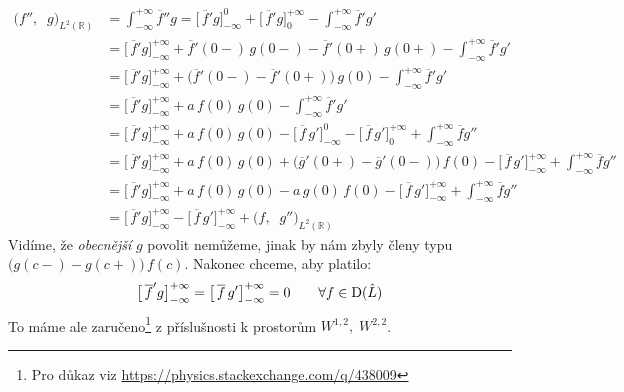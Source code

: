 \documentclass{article}
\newcommand{\R}{\mathbb{R}}
\begin{document}
\begin{align*}
    \big( f'', \;\; g \big)_{L^2(\R)}
    &= \int_{-\infty}^{+\infty} \overline f'' g
    = \big[ \, \overline f' g \big]_{-\infty}^{0}
    + \big[ \, \overline f' g \big]_{0}^{+\infty}
    - \int_{-\infty}^{+\infty} \overline f' g' \\[5pt]
    &= \big[ \, \overline f' g \big]_{-\infty}^{+\infty}
    + \overline f'\!(0-) \, g(0-) - \overline f'\!(0+) \, g(0+)
    - \int_{-\infty}^{+\infty} \overline f' g' \\[5pt]
    &= \big[ \, \overline f' g \big]_{-\infty}^{+\infty}
    + \Big( \overline f'(0-) - \overline f'(0+) \Big) \, g(0)
    - \int_{-\infty}^{+\infty} \overline f' g' \\[5pt]
    &= \big[ \, \overline f' g \big]_{-\infty}^{+\infty}
    + a \, f(0) \, g(0)
    - \int_{-\infty}^{+\infty} \overline f' g' \\[5pt]
    &= \big[ \, \overline f' g \big]_{-\infty}^{+\infty}
    + a \, f(0) \, g(0)
    - \big[ \, \overline f \, g' \big]_{-\infty}^{0}
    - \big[ \, \overline f \, g' \big]_{0}^{+\infty}
    + \int_{-\infty}^{+\infty} \overline f g'' \\[5pt]
    &= \big[ \, \overline f' g \big]_{-\infty}^{+\infty}
    + a \, f(0) \, g(0)
    + \Big( \overline g'(0+) - \overline g'(0-) \Big) \, f(0)
    - \big[ \, \overline f \, g' \big]_{-\infty}^{+\infty}
    + \int_{-\infty}^{+\infty} \overline f g'' \\[5pt]
    &= \big[ \, \overline f' g \big]_{-\infty}^{+\infty}
    + a \, f(0) \, g(0)
    - a \, g(0) \, f(0)
    - \big[ \, \overline f \, g' \big]_{-\infty}^{+\infty}
    + \int_{-\infty}^{+\infty} \overline f g'' \\[5pt]
    &= \big[ \, \overline f' g \big]_{-\infty}^{+\infty}
    - \big[ \, \overline f \, g' \big]_{-\infty}^{+\infty}
    + \big( f, \;\; g'' \big)_{L^2(\R)}
\end{align*}
Vidíme, že \textit{obecnější} $g$ povolit nemůžeme, jinak by nám zbyly členy typu $\big(g(c-) - g(c+)\big) \, f(c)$. Nakonec chceme, aby platilo:
\begin{equation*}
    \big[ \, \overline f' g \big]_{-\infty}^{+\infty}
    = \big[ \, \overline f \, g' \big]_{-\infty}^{+\infty}
    = 0
    \qquad \forall f \in {\rm D}(\hat L)
    \label{eq:okrajove-podminky}
\end{equation*}
To máme ale zaručeno\footnote{Pro důkaz viz \url{https://physics.stackexchange.com/q/438009}} z příslušnosti k prostorům $W^{1,2}, \; W^{2,2}$.
\end{document}
